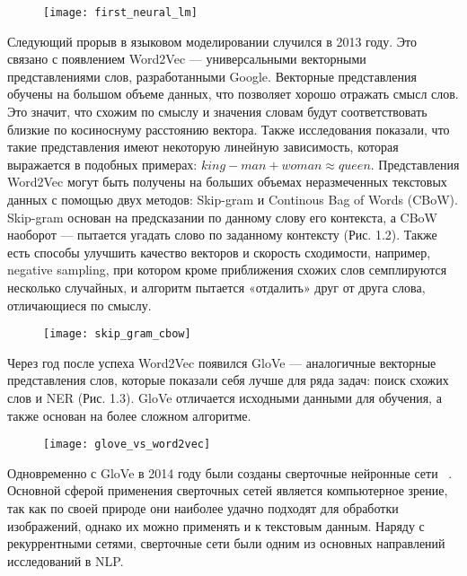 \begin{figure}[ht]
\centering
	\texttt{[image: first\_neural\_lm]}
\end{figure}

Следующий прорыв в языковом моделировании случился в 2013 году. Это связано с появлением Word2Vec --- универсальными векторными представлениями слов, разработанными Google. Векторные представления обучены на большом объеме данных, что позволяет хорошо отражать смысл слов. Это значит, что схожим по смыслу и значения словам будут соответствовать близкие по косиноснуму расстоянию вектора. Также исследования показали, что такие представления имеют некоторую линейную зависимость, которая выражается в подобных примерах: $king - man + woman \approx queen$.
Представления Word2Vec могут быть получены на больших объемах неразмеченных текстовых данных с помощью двух методов: Skip-gram и Continous Bag of Words (CBoW). Skip-gram основан на предсказании по данному слову его контекста, а CBoW наоборот --- пытается угадать слово по заданному контексту (Рис. 1.2). Также есть способы улучшить качество векторов и скорость сходимости, например, negative sampling, при котором кроме приближения схожих слов семплируются несколько случайных, и алгоритм пытается «отдалить» друг от друга слова, отличающиеся по смыслу.

\begin{figure}[ht]
	\texttt{[image: skip\_gram\_cbow]}
\end{figure}

Через год после успеха Word2Vec появился GloVe --- аналогичные векторные представления слов, которые показали себя лучше для ряда задач: поиск схожих слов и NER (Рис. 1.3). GloVe отличается исходными данными для обучения, а также основан на более сложном алгоритме.~\cite{twds-lm-history}

\begin{figure}[ht]
	\texttt{[image: glove\_vs\_word2vec]}
\end{figure}

Одновременно с GloVe в 2014 году были созданы сверточные нейронные сети ~\cite{kalchbrenner-etal-2014-convolutional}. Основной сферой применения сверточных сетей является компьютерное зрение, так как по своей природе они наиболее удачно подходят для обработки изображений, однако их можно применять и к текстовым данным. Наряду с рекуррентными сетями, сверточные сети были одним из основных направлений исследований в NLP.

